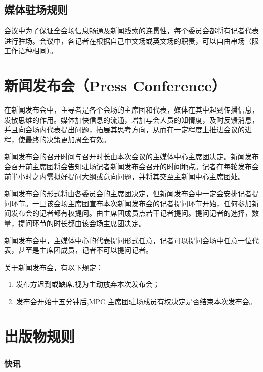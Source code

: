 \documentclass[a4paper,openany]{book}
\begin{document}
\subsection{媒体驻场规则}

会议中为了保证全会场信息畅通及新闻线索的连贯性，每个委员会都将有记者代表进行驻场。会议中，各记者在根据自己中文场或英文场的职责，可以自由串场（限工作语种相同）。

\section{新闻发布会（Press Conference）}

在新闻发布会中，主导者是各个会场的主席团和代表，媒体在其中起到传播信息，发散思维的作用。媒体加快信息的流通，增加与会人员的知情度，及时反馈消息，并且向会场内代表提出问题，拓展其思考方向，从而在一定程度上推进会议的进程，使最终的决策更加周全有效。

新闻发布会的召开时间与召开时长由本次会议的主媒体中心主席团决定。新闻发布会召开前主席团将会告知驻场记者新闻发布会召开的时间地点。记者在每轮发布会前半小时之内需拟好提问大纲或意向问题，并将其交至主新闻中心主席团处。

新闻发布会的形式将由各委员会的主席团决定，但新闻发布会中一定会安排记者提问环节。一旦该会场主席团宣布本次新闻发布会的记者提问环节开始，任何参加新闻发布会的记者都有权提问。由主席团成员点若干记者提问。提问记者的选择，数量，提问环节的时长都由该会场主席团决定。

新闻发布会中，主媒体中心的代表提问形式任意，记者可以提问会场中任意一位代表，甚至是主席团成员，记者不可以提问记者。

关于新闻发布会，有以下规定：

\begin{enumerate}

\item 发布方迟到或缺席,视为主动放弃本次发布会；

\item 发布会开始十五分钟后,MPC 主席团驻场成员有权决定是否结束本次发布会。

\end{enumerate}

\section{出版物规则}

\subsubsection{快讯}
\end{document}

